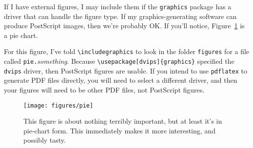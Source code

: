 If I have external figures, I may include them if the \texttt{graphics}
package has a driver that can handle the figure type.  If my
graphics-generating software can produce PostScript images, then we're
probably OK.  If you'll notice, Figure~\ref{fig:piechart} is a pie chart.

For this figure, I've told \verb+\includegraphics+ to look in the
folder \texttt{figures} for a file called
\mbox{\texttt{pie.}\textit{something}}.  Because
\verb+\usepackage[dvips]{graphics}+ specified the \texttt{dvips}
driver, then PostScript figures are usable.  If you intend to use
\texttt{pdflatex} to generate PDF files directly, you will need to
select a different driver, and then your figures will need to be other
PDF files, not PostScript figures.

\begin{figure}
\begin{center}
\texttt{[image: figures/pie]}
\end{center}
\caption{This figure is about nothing terribly important, but at
  least it's in pie-chart form.  This immediately makes it more
  interesting, and possibly tasty.\label{fig:piechart}}
\end{figure}

